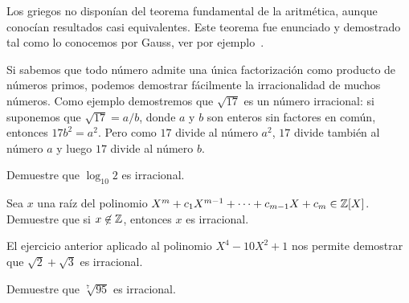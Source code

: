 Los griegos no disponían del teorema fundamental de la aritmética, 
aunque conocían resultados casi equivalentes. Este teorema
fue enunciado y demostrado tal como lo conocemos por Gauss, 
ver por ejemplo~\cite{MR1277244,MR1849798,MR1163928,MR497463}. 

Si sabemos que todo número admite una única
factorización como producto de números primos, podemos demostrar fácilmente la
irracionalidad de muchos números. Como ejemplo demostremos que $\sqrt{17}$ es
un número irracional: si suponemos que $\sqrt{17}=a/b$, donde $a$ y $b$ son
enteros sin factores en común, entonces $17b^2=a^2$. Pero como $17$ divide al
número $a^2$, $17$ divide también al número $a$ y luego $17$ divide al número
$b$.

\begin{exercise}
	Demuestre que $\log_{10}2$ es irracional.
\end{exercise}

\begin{exercise}
	Sea $x$ una raíz del polinomio $X^m+c_1X^{m-1}+\cdots+c_{m-1}X+c_m\in\mathbb{Z}[X]$. 
	Demuestre que si $x\not\in\mathbb{Z}$, entonces $x$ es irracional. 
\end{exercise}


El ejercicio anterior aplicado al polinomio $X^4-10X^2+1$ 
nos permite demostrar que $\sqrt{2}+\sqrt{3}$ es irracional. 

\begin{exercise}
	Demuestre que $\sqrt[7]{95}$ es irracional.
\end{exercise}


